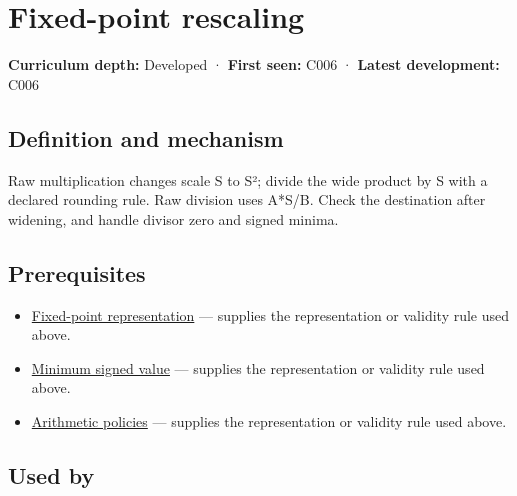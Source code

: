 \hypertarget{appendix-3333db47830f}{}\label{referencestart:appendix-3333db47830f}
\section{Fixed-point rescaling}\label{appendix-3333db47830f-fixed-point-rescaling}

\hypertarget{appendix-3333db47830f-fixed-point-rescaling}{}

\textbf{Curriculum depth:} Developed · \textbf{First seen:} C006 · \textbf{Latest development:} C006

\begin{allmightroledefinition}

\subsection{Definition and mechanism}\label{appendix-3333db47830f-definition-and-mechanism}

\hypertarget{appendix-3333db47830f-definition-and-mechanism}{}

Raw multiplication changes scale S to S²; divide the wide product by S with a declared rounding rule. Raw division uses A*S/B. Check the destination after widening, and handle divisor zero and signed minima.

\end{allmightroledefinition}

\subsection{Prerequisites}\label{appendix-3333db47830f-prerequisites}

\hypertarget{appendix-3333db47830f-prerequisites}{}

\begin{itemize}
\tightlist
\item
  \hyperref[appendix-1d0dbe8924cc]{Fixed-point representation} --- supplies the representation or validity rule used above.
\item
  \hyperref[appendix-05f39b10364d]{Minimum signed value} --- supplies the representation or validity rule used above.
\item
  \hyperref[appendix-2ed044358b82]{Arithmetic policies} --- supplies the representation or validity rule used above.
\end{itemize}

\subsection{Used by}\label{appendix-3333db47830f-used-by}

